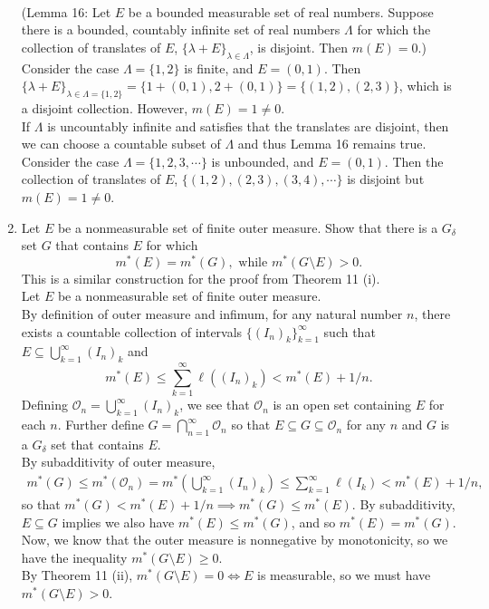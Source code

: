 \begin{enumerate}
	\\(Lemma 16: Let $E$ be a bounded measurable set of real numbers. Suppose there is a bounded, countably infinite set of real numbers $\Lambda$ for which the collection of translates of $E$, $\{\lambda+E\}_{\lambda\in\Lambda}$, is disjoint. Then $m(E)=0$.)\\
	Consider the case $\Lambda=\{1,2\}$ is finite, and $E=(0,1)$. Then $\{\lambda+E\}_{\lambda\in\Lambda=\{1,2\}}=\{1+(0,1),2+(0,1)\}=\{(1,2),(2,3)\}$, which is a disjoint collection. However, $m(E)=1\neq0$.\\
	If $\Lambda$ is uncountably infinite and satisfies that the translates are disjoint, then we can choose a countable subset of $\Lambda$ and thus Lemma 16 remains true.\\
	Consider the case $\Lambda=\{1,2,3,\cdots\}$ is unbounded, and $E=(0,1)$. Then the collection of translates of $E$, $\{(1,2),(2,3),(3,4),\cdots\}$ is disjoint but $m(E)=1\neq0$.
	\item Let $E$ be a nonmeasurable set of finite outer measure. Show that there is a $G_\delta$ set $G$ that contains $E$ for which
	\[
		m^*(E)=m^*(G),\text{ while }m^*(G\setminus E)>0.
	\]
	This is a similar construction for the proof from Theorem 11 (i).\\
	Let $E$ be a nonmeasurable set of finite outer measure.\\
	By definition of outer measure and infimum, for any natural number $n$, there exists a countable collection of intervals $\{(I_n)_k\}_{k=1}^\infty$ such that $E\subseteq\bigcup_{k=1}^\infty (I_n)_k$ and
	\[
		m^*(E)\le\sum_{k=1}^\infty\ell((I_n)_k)<m^*(E)+1/n.	
	\]
	Defining $\mathcal{O}_n=\bigcup_{k=1}^\infty (I_n)_k$, we see that $\mathcal{O}_n$ is an open set containing $E$ for each $n$.
	Further define $G=\bigcap_{n=1}^\infty\mathcal{O}_n$ so that $E\subseteq G\subseteq\mathcal{O}_n$ for any $n$ and $G$ is a $G_\delta$ set that contains $E$.\\
	By subadditivity of outer measure,
	\begin{align*}
		m^*(G)\le m^*(\mathcal{O}_n)=m^*(\bigcup_{k=1}^\infty (I_n)_k)\le\sum_{k=1}^\infty\ell(I_k)<m^*(E)+1/n,
	\end{align*}
	so that $m^*(G)<m^*(E)+1/n\implies m^*(G)\le m^*(E)$.
	By subadditivity, $E\subseteq G$ implies we also have $m^*(E)\le m^*(G)$, and so $m^*(E)=m^*(G)$.\\
	Now, we know that the outer measure is nonnegative by monotonicity, so we have the inequality $m^*(G\setminus E)\ge0$.\\
	By Theorem 11 (ii), $m^*(G\setminus E)=0\iff E$ is measurable, so we must have $m^*(G\setminus E)>0$.
\end{enumerate}

